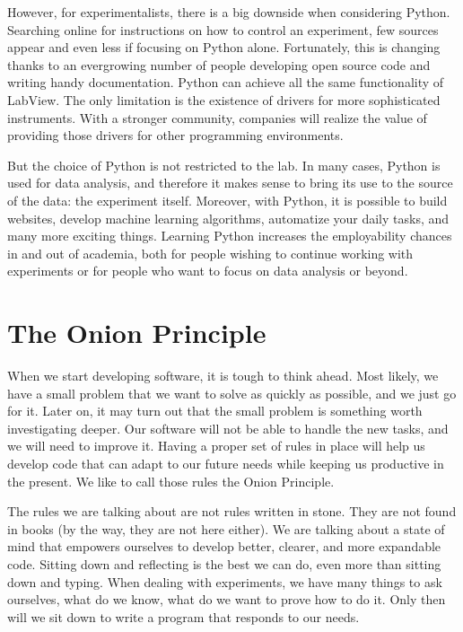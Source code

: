However, for experimentalists, there is a big downside when considering Python. Searching online for instructions on how to control an experiment, few sources appear and even less if focusing on Python alone. Fortunately, this is changing thanks to an evergrowing number of people developing open source code and writing handy documentation. Python can achieve all the same functionality of LabView. The only limitation is the existence of drivers for more sophisticated instruments. With a stronger community, companies will realize the value of providing those drivers for other programming environments.

But the choice of Python is not restricted to the lab. In many cases, Python is used for data analysis, and therefore it makes sense to bring its use to the source of the data: the experiment itself. Moreover, with Python, it is possible to build websites, develop machine learning algorithms, automatize your daily tasks, and many more exciting things. Learning Python increases the employability chances in and out of academia, both for people wishing to continue working with experiments or for people who want to focus on data analysis or beyond.

\section{The Onion Principle}\label{sec:onion-principle}
When we start developing software, it is tough to think ahead. Most likely, we have a small problem that we want to solve as quickly as possible, and we just go for it. Later on, it may turn out that the small problem is something worth investigating deeper. Our software will not be able to handle the new tasks, and we will need to improve it. Having a proper set of rules in place will help us develop code that can adapt to our future needs while keeping us productive in the present. We like to call those rules the Onion Principle.

The rules we are talking about are not rules written in stone. They are not found in books (by the way, they are not here either). We are talking about a state of mind that empowers ourselves to develop better, clearer, and more expandable code. Sitting down and reflecting is the best we can do, even more than sitting down and typing. When dealing with experiments, we have many things to ask ourselves, what do we know, what do we want to prove how to do it. Only then will we sit down to write a program that responds to our needs.

